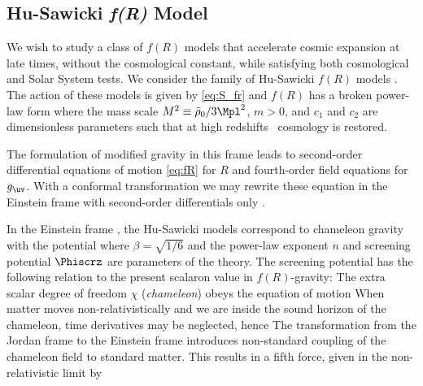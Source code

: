 \subsection{Hu-Sawicki \texorpdfstring{\textit{\lowercase{f}(R)}}{fR} Model}
We wish to study a class of $f(R)$ models that accelerate cosmic expansion at late times, without the cosmological constant, while satisfying both cosmological and Solar System tests. We consider the family of Hu-Sawicki $f(R)$ models \parencite{Hu-Saw}. The action of these models is given by \eqref{eq:S_fr} and $f(R)$ has a broken power-law form
where the mass scale $M^2\equiv\bar\rho_0/3\Mpl^2$, $m>0$, and $c_1$ and $c_2$ are dimensionless parameters such that at high redshifts \LCDM\ cosmology is restored.

The formulation of modified gravity in this frame leads to second-order differential equations of motion \eqref{eq:fR} for $R$ and fourth-order field equations for $g_\uv$. With a conformal transformation we may rewrite these equation in the Einstein frame with second-order differentials only \parencite[see, e.g.,][]{CHIBA20031}.

In the Einstein frame , the Hu-Sawicki models correspond to chameleon gravity with the potential
where $\beta=\sqrt{1/6}$ and the power-law exponent $n$ and screening potential $\Phiscrz$ are parameters of the theory. The screening potential has the following relation to the present scalaron value in $f(R)$-gravity:
The extra scalar degree of freedom $\chi$ (\textit{chameleon}) obeys the equation of motion
When matter moves non-relativistically and we are inside the sound horizon of the chameleon, time derivatives may be neglected, hence
The transformation from the Jordan frame to the Einstein frame introduces non-standard coupling of the chameleon field to standard matter. This results in a fifth force, given in the non-relativistic limit by
